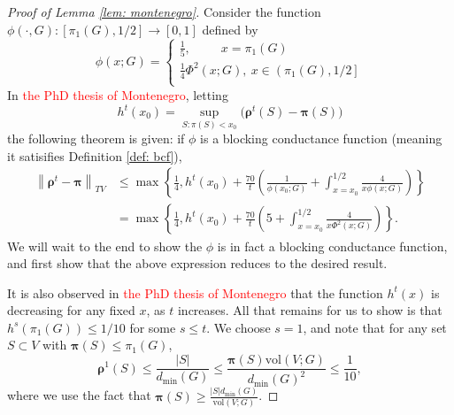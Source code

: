 \documentclass{article}
\newcommand{\vol}{\mathrm{vol}}
\newcommand{\abs}[1]{\left \lvert #1 \right \rvert}
\newcommand{\norm}[1]{\left\lVert#1\right\rVert}
\newcommand{\1}{\mathbf{1}}
\newcommand{\pibf}{\bm{\pi}}
\newcommand{\rhobf}{\bm{\rho}}
\theoremstyle{aldenthm}
\begin{document}
\begin{proof}[Proof of Lemma \ref{lem: montenegro}]
	Consider the function $\phi(\cdot, G): [\pi_1(G), 1/2] \to [0,1]$ defined by
	\begin{equation}
	\label{eqn: bcf}
	\phi(x; G) = 
	\begin{cases}
	\frac{1}{5}, ~~~~~~~~~~~ x = \pi_1(G) \\
	\frac{1}{4} \Phi^2(x; G), ~ x \in \left(\pi_1(G), 1/2\right] \\
	\end{cases}
	\end{equation}
	In \textcolor{red}{the PhD thesis of Montenegro}, letting
	\begin{equation*}
	h^t(x_0) = \sup_{S: \pi(S) < x_0}  \bigl(\rhobf^t(S) - \pibf(S) \bigr)
	\end{equation*}
	the following theorem is given: if $\phi$ is a blocking conductance function (meaning it satisifies Definition \ref{def: bcf}), 
	\begin{align*}
	\norm{\rhobf^t - \pibf}_{TV} & \leq \max\left\{ \frac{1}{4}, h^t(x_0) +  \frac{70}{t}\left(\frac{1}{\phi(x_0; G)} + \int_{x = x_0}^{1/2} \frac{4}{x \phi(x; G)}\right) \right\} \\
	& = \max\left\{ \frac{1}{4}, h^t(x_0) +  \frac{70}{t}\left(5 + \int_{x = x_0}^{1/2} \frac{4}{x \Phi^2(x; G)}\right) \right\}.
	\end{align*}
	We will wait to the end to show the $\phi$ is in fact a blocking conductance function, and first show that the above expression reduces to the desired result.
	
	It is also observed in \textcolor{red}{the PhD thesis of Montenegro} that the function $h^t(x)$ is decreasing for any fixed $x$, as $t$ increases. All that remains for us to show is that $h^s(\pi_1(G)) \leq 1/10$ for some $s \leq t$. We choose $s = 1$, and note that for any set $S \subset V$ with $\pibf(S) \leq \pi_1(G)$,
	\begin{equation*}
	\rhobf^1(S) \leq \frac{\abs{S}}{d_{\min}(G)} \leq \frac{\pibf(S) \vol(V; G)}{d_{\min}(G)^2} \leq \frac{1}{10},
	\end{equation*}
	where we use the fact that $\pibf(S) \geq \frac{\abs{S} d_{\min}(G)}{\vol(V; G)}$.
	

\end{proof}
\end{document}
